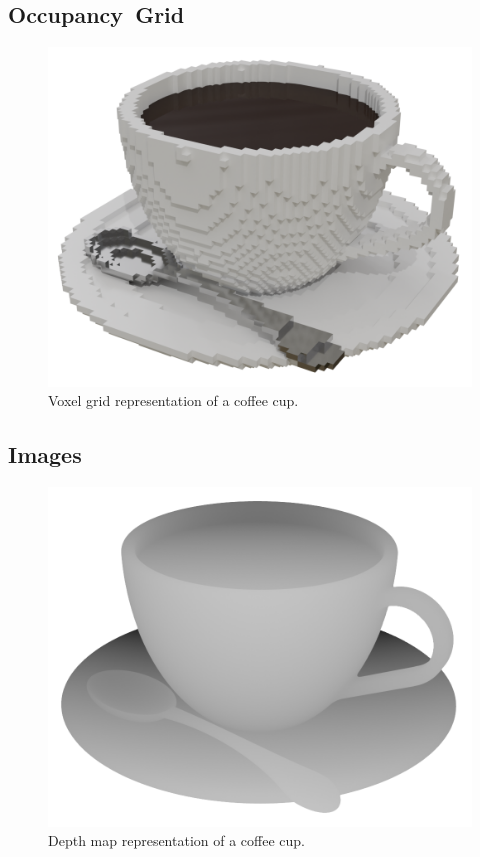 \subsection{Occupancy~Grid}
\label{subsec:occupancy_grid}

\begin{figure}[h]
	\centering
	\includegraphics[scale=0.2]{Images/Voxel Cup}
	\caption{Voxel grid representation of a coffee cup.}
	\label{fig:voxel_cup}
\end{figure}

\subsection{Images}

\begin{figure}[h]
	\centering
	\includegraphics[scale=0.2]{Images/Depth Map Cup}
	\caption{Depth map representation of a coffee cup.}
	\label{fig:depth_map_cup}
\end{figure}

